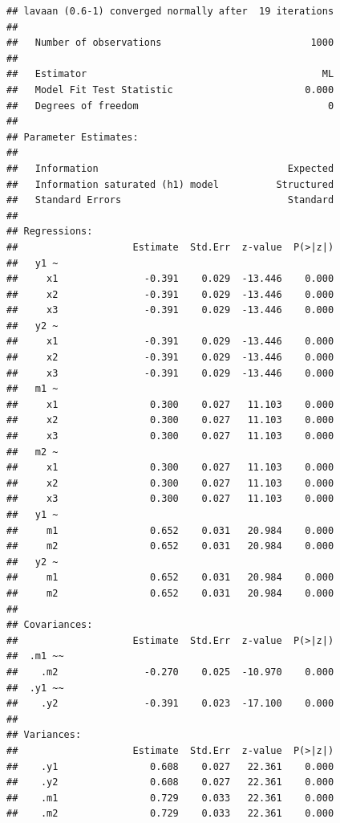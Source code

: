 \documentclass[]{article}
\begin{document}
\begin{verbatim}
## lavaan (0.6-1) converged normally after  19 iterations
## 
##   Number of observations                          1000
## 
##   Estimator                                         ML
##   Model Fit Test Statistic                       0.000
##   Degrees of freedom                                 0
## 
## Parameter Estimates:
## 
##   Information                                 Expected
##   Information saturated (h1) model          Structured
##   Standard Errors                             Standard
## 
## Regressions:
##                    Estimate  Std.Err  z-value  P(>|z|)
##   y1 ~                                                
##     x1               -0.391    0.029  -13.446    0.000
##     x2               -0.391    0.029  -13.446    0.000
##     x3               -0.391    0.029  -13.446    0.000
##   y2 ~                                                
##     x1               -0.391    0.029  -13.446    0.000
##     x2               -0.391    0.029  -13.446    0.000
##     x3               -0.391    0.029  -13.446    0.000
##   m1 ~                                                
##     x1                0.300    0.027   11.103    0.000
##     x2                0.300    0.027   11.103    0.000
##     x3                0.300    0.027   11.103    0.000
##   m2 ~                                                
##     x1                0.300    0.027   11.103    0.000
##     x2                0.300    0.027   11.103    0.000
##     x3                0.300    0.027   11.103    0.000
##   y1 ~                                                
##     m1                0.652    0.031   20.984    0.000
##     m2                0.652    0.031   20.984    0.000
##   y2 ~                                                
##     m1                0.652    0.031   20.984    0.000
##     m2                0.652    0.031   20.984    0.000
## 
## Covariances:
##                    Estimate  Std.Err  z-value  P(>|z|)
##  .m1 ~~                                               
##    .m2               -0.270    0.025  -10.970    0.000
##  .y1 ~~                                               
##    .y2               -0.391    0.023  -17.100    0.000
## 
## Variances:
##                    Estimate  Std.Err  z-value  P(>|z|)
##    .y1                0.608    0.027   22.361    0.000
##    .y2                0.608    0.027   22.361    0.000
##    .m1                0.729    0.033   22.361    0.000
##    .m2                0.729    0.033   22.361    0.000
\end{verbatim}
\end{document}
